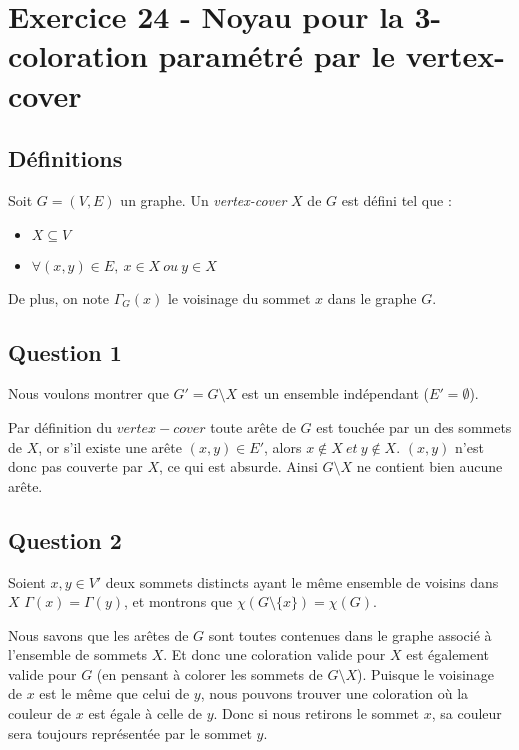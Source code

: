 
\section{Exercice 24 - Noyau pour la 3-coloration paramétré par le vertex-cover}\label{ex16}

\subsection{Définitions}\label{ex24_def}
Soit $G = (V,E)$ un graphe. Un {\em vertex-cover} $X$ de $G$ est défini tel que :
\begin{itemize}
	\item $X \subseteq V$
	\item $\forall (x,y) \in E,\ x \in X\ ou\ y \in X$\\
\end{itemize}
De plus, on note $\Gamma_G(x)$ le voisinage du sommet $x$ dans le graphe
$G$.

\subsection{Question 1}\label{ex24_q1}
Nous voulons montrer que $G' = G \setminus X$ est un ensemble indépendant ($E' =
\emptyset$).

Par définition du $vertex-cover$ toute arête de $G$ est touchée par un des sommets de
$X$, or 
s'il existe une arête $(x,y) \in E'$, alors $x \notin X\ et\ y \notin X$.
$(x,y)$ n'est donc pas couverte par $X$,
ce qui est absurde.
Ainsi $G \setminus X$ ne contient bien aucune arête.

\subsection{Question 2}\label{ex24_q2}
Soient $x,y \in V'$ deux sommets distincts ayant le même ensemble de voisins dans $X$
$\Gamma(x) = \Gamma(y)$, et
montrons que $\chi(G \setminus \{x\}) = \chi(G)$.

Nous savons que les arêtes de $G$ sont toutes contenues dans le graphe associé à
l'ensemble de sommets $X$. Et donc une coloration valide pour $X$ est également valide
pour $G$ (en pensant à colorer les sommets de $G \setminus X$).
Puisque le voisinage de $x$ est le même que celui de $y$, nous pouvons trouver une
coloration où la couleur de $x$ est égale à celle de $y$.
Donc si nous retirons le sommet $x$, sa couleur sera toujours représentée par le
sommet $y$.
